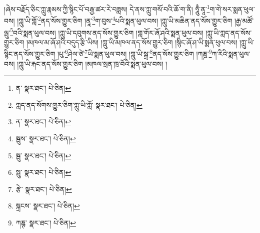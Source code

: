 །ཞེས་བརྗོད་ཅིང་ཀླུ་རྣམས་ཀྱི་སྙིང་པོ་བརྒྱ་ཚར་རེ་བཟླས། དེ་ནས་ཀླུ་གསོ་བའི་ཆོ་ག་ནི། ཧཱུྃ་ནཱ་\footnote{ན་  སྣར་ཐང་།  པེ་ཅིན། }ག་གེ་སར་སྨན་ཕུལ་བས། །ཀླུ་ཡི་གློ་\footnote{ཀླད་ནད་སོགས་གྱུར་ཅིག་ཀླུ་ཡི་ཀློ་  སྣར་ཐང་།  པེ་ཅིན། }ནད་སོས་གྱུར་ཅིག །ནཱ་\footnote{ན་  སྣར་ཐང་།  པེ་ཅིན། }ག་བུས་\footnote{སྦུས་  སྣར་ཐང་།  པེ་ཅིན། }པའི་སྨན་ཕུལ་བས། །ཀླུ་ཡི་མཆིན་ནད་སོས་གྱུར་ཅིག །རྒྱ་མཚོ་ལྦུ་\footnote{སྦུ་  སྣར་ཐང་།  པེ་ཅིན། }བའི་སྨན་ཕུལ་བས། །ཀླུ་ཡི་དབུགས་ནད་སོས་གྱུར་ཅིག །གླ་གོར་ཞོ་ཤའི་སྨན་ཕུལ་བས། །ཀླུ་ཡི་ཀླད་ནད་སོས་གྱུར་ཅིག །མཁལ་མ་ཞོ་ཤའི་བདུད་རྩི་ཡིས། །ཀླུ་ཡི་མཁལ་ནད་སོས་གྱུར་ཅིག །སྙིང་ཞོ་ཤ་ཡི་སྨན་ཕུལ་བས། །ཀླུ་ཡི་སྙིང་ནད་སོས་གྱུར་ཅིག །པུ་\footnote{སྦུ་  སྣར་ཐང་།  པེ་ཅིན། }ཤེལ་ཙེ་\footnote{རྩེ་  སྣར་ཐང་།  པེ་ཅིན། }ཡི་སྨན་ཕུལ་བས། །ཀླུ་ཡི་སྐྲ་\footnote{སྐྲངས་  སྣར་ཐང་།  པེ་ཅིན། }ནད་སོས་གྱུར་ཅིག །ཀཎྜ་\footnote{ཀཎྚ་  སྣར་ཐང་།  པེ་ཅིན། }ཀ་རིའི་སྨན་ཕུལ་བས། །ཀླུ་ཡི་རྐང་ནད་སོས་གྱུར་ཅིག །མཁལ་སྲན་ཁྲ་བོའི་སྨན་ཕུལ་བས། །
